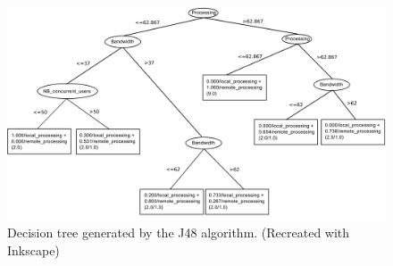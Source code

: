 \begin{figure}[H]
  \centering
  \includegraphics[width=1\textwidth]{../images/decision_tree.png}
  \caption{Decision tree generated by the J48 algorithm. (Recreated with Inkscape)}
  \label{fig:decision-tree}
\end{figure}

